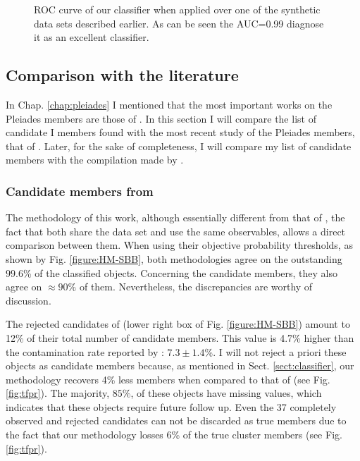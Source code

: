 \begin{figure}[!htp]
\begin{center}
\caption{ROC curve of our classifier when applied over one of the synthetic data sets described earlier. As can be seen the AUC=0.99 diagnose it as an excellent classifier.}
\label{fig:ROC}
\end{center}
\end{figure}

 
\subsection{Comparison with the literature}
In Chap. \ref{chap:pleiades} I mentioned that the most important works on the Pleiades members are those of \citet{Stauffer2007,Lodieu2012,Sarro2014,Bouy2015}. In this section I will compare the list of candidate I members found with the most recent study of the Pleiades members, that of \citet{Bouy2015}. Later, for the sake of completeness, I will compare my list of candidate members with the compilation made by \citet{Stauffer2007}.  

\subsubsection{Candidate members from \citet{Bouy2015}}
\label{sect:comparisonBouy}
The methodology of this work, although essentially different from that of \citet{Bouy2015}, the fact that both share the data set and use the same observables, allows a direct comparison between them. When using their objective probability thresholds, as shown by Fig. \ref{figure:HM-SBB}, both methodologies agree on the outstanding $99.6$\% of the classified objects. Concerning the candidate members, they also agree on $\approx 90\%$ of them. Nevertheless, the discrepancies are worthy of discussion.

The rejected candidates of \citet{Bouy2015} (lower right box of Fig. \ref{figure:HM-SBB}) amount to 12\% of their total number of candidate members. This value is 4.7\% higher than the contamination rate reported by \citet{Sarro2014}: $7.3\pm1.4$\%. I will not reject a priori these objects as candidate members because, as mentioned in Sect. \ref{sect:classifier}, our methodology recovers 4\% less members when compared to that of \citet{Sarro2014}(see Fig. \ref{fig:tfpr}). The majority, $85\%$, of these objects have missing values, which indicates that these objects require future follow up. Even the 37 completely observed and rejected candidates can not be discarded as true members due to the fact that our methodology losses 6\% of the true cluster members (see Fig. \ref{fig:tfpr}).  

